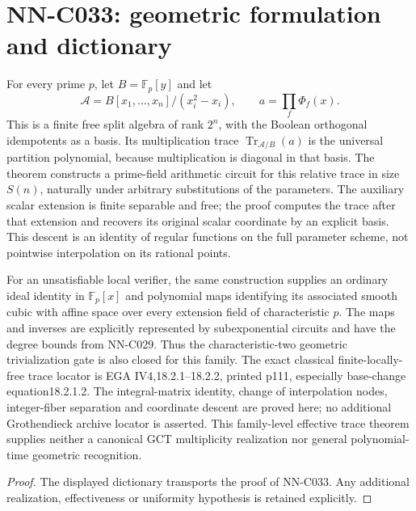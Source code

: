 \section{NN-C033: geometric formulation and dictionary}
\begin{geometricstatement}[NN-C033]
For every prime $p$, let $B=\mathbb F_p[y]$ and let
\[
 \mathscr A=B[x_1,\ldots,x_n]/(x_i^2-x_i),\qquad
       a=\prod_f\Phi_f(x).
\]
This is a finite free split algebra of rank $2^n$, with the Boolean orthogonal idempotents as a basis. Its multiplication trace $\operatorname{Tr}_{\mathscr A/B}(a)$ is the universal partition polynomial, because multiplication is diagonal in that basis. The theorem constructs a prime-field arithmetic circuit for this relative trace in size $S(n)$, naturally under arbitrary substitutions of the parameters. The auxiliary scalar extension is finite separable and free; the proof computes the trace after that extension and recovers its original scalar coordinate by an explicit basis. This descent is an identity of regular functions on the full parameter scheme, not pointwise interpolation on its rational points.

For an unsatisfiable local verifier, the same construction supplies an ordinary ideal identity in $\mathbb F_p[x]$ and polynomial maps identifying its associated smooth cubic with affine space over every extension field of characteristic $p$. The maps and inverses are explicitly represented by subexponential circuits and have the degree bounds from NN-C029. Thus the characteristic-two geometric trivialization gate is also closed for this family. The exact classical finite-locally-free trace locator is EGA IV4,18.2.1--18.2.2, printed p111, especially base-change equation18.2.1.2. The integral-matrix identity, change of interpolation nodes, integer-fiber separation and coordinate descent are proved here; no additional Grothendieck archive locator is asserted. This family-level effective trace theorem supplies neither a canonical GCT multiplicity realization nor general polynomial-time geometric recognition.
\end{geometricstatement}
\begin{proof} The displayed dictionary transports the proof of NN-C033. Any additional realization, effectiveness or uniformity hypothesis is retained explicitly.\end{proof}


